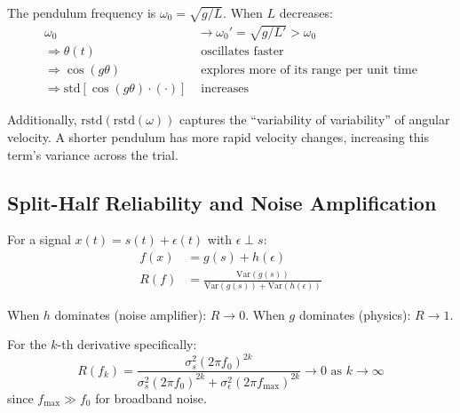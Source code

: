 \documentclass[11pt,a4paper]{article}
\begin{document}
The pendulum frequency is $\omega_0 = \sqrt{g/L}$. When $L$ decreases:
\begin{align}
\omega_0 &\to \omega_0' = \sqrt{g/L'} > \omega_0 \\
\Rightarrow \theta(t) &\text{ oscillates faster} \\
\Rightarrow \cos(g\theta) &\text{ explores more of its range per unit time} \\
\Rightarrow \text{std}[\cos(g\theta) \cdot (\cdot)] &\text{ increases}
\end{align}

Additionally, $\text{rstd}(\text{rstd}(\omega))$ captures the ``variability
of variability'' of angular velocity. A shorter pendulum has more rapid
velocity changes, increasing this term's variance across the trial.

\subsection{Split-Half Reliability and Noise Amplification}

For a signal $x(t) = s(t) + \epsilon(t)$ with $\epsilon \perp s$:
\begin{align}
f(x) &= g(s) + h(\epsilon) \\
R(f) &= \frac{\text{Var}(g(s))}{\text{Var}(g(s)) + \text{Var}(h(\epsilon))}
\end{align}

When $h$ dominates (noise amplifier): $R \to 0$.
When $g$ dominates (physics): $R \to 1$.

For the $k$-th derivative specifically:
\[
R(f_k) = \frac{\sigma_s^2 (2\pi f_0)^{2k}}
{\sigma_s^2 (2\pi f_0)^{2k} + \sigma_\epsilon^2 (2\pi f_{\max})^{2k}}
\to 0 \text{ as } k \to \infty
\]
since $f_{\max} \gg f_0$ for broadband noise.
\end{document}
